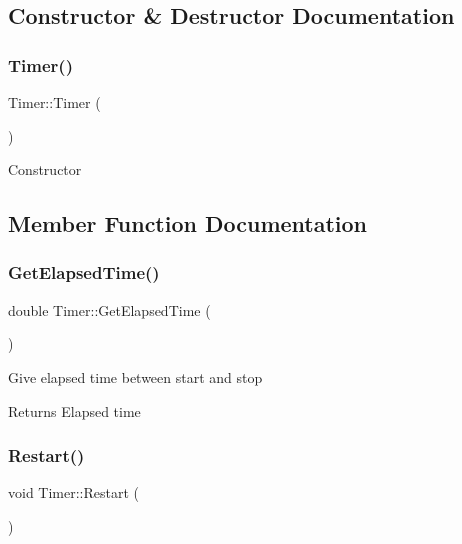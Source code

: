 \subsection{Constructor \& Destructor Documentation}
\mbox{\label{class_timer_a5f16e8da27d2a5a5242dead46de05d97}} 
\subsubsection{\texorpdfstring{Timer()}{Timer()}}
{\footnotesize\ttfamily Timer\+::\+Timer (\begin{DoxyParamCaption}{ }\end{DoxyParamCaption})}



Constructor 



\subsection{Member Function Documentation}
\mbox{\label{class_timer_abee36a752625ebb88c77e41979e8b3d6}} 
\subsubsection{\texorpdfstring{Get\+Elapsed\+Time()}{GetElapsedTime()}}
{\footnotesize\ttfamily double Timer\+::\+Get\+Elapsed\+Time (\begin{DoxyParamCaption}{ }\end{DoxyParamCaption})}



Give elapsed time between start and stop 

\begin{DoxyReturn}{Returns}
Elapsed time
\end{DoxyReturn}
\mbox{\label{class_timer_a44a5a286f0086968f0b079c089befbd2}} 
\subsubsection{\texorpdfstring{Restart()}{Restart()}}
{\footnotesize\ttfamily void Timer\+::\+Restart (\begin{DoxyParamCaption}{ }\end{DoxyParamCaption})}



